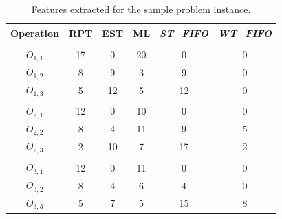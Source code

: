 \documentclass[runningheads]{llncs}
\newcommand{\stfifo}{\textit{ST\_FIFO}\xspace}
\newcommand{\wtfifo}{\textit{WT\_FIFO}\xspace}
\begin{document}
\begin{table}[tb]
  \setlength{\tabcolsep}{10.0pt}
  \centering
    \begin{center}
    \caption{Features extracted for the sample problem instance.}
    \label{tab3}
      \begin{tabular}{c  c  c  c  c  c}
        \textbf{Operation} & \textbf{RPT} & \textbf{EST} & \textbf{ML} & \textbf{\stfifo} & \textbf{\wtfifo}\\
        \hline
                      \\
        $O_{1,1}$  & 17 & 0   & 20	&  0  & 0\\
        $O_{1,2}$  & 8  & 9   & 3		&  9  & 0\\
        $O_{1,3}$  & 5  & 12  & 5	  &  12 & 0\\
                      \\
        $O_{2,1}$  & 12 & 0   & 10	&  0  & 0\\
        $O_{2,2}$  & 8  & 4   & 11	&  9  & 5\\
        $O_{2,3}$  & 2  & 10  & 7	  &  17 & 2\\
                          \\
        $O_{3,1}$  & 12 & 0  & 11	  &  0  & 0\\
        $O_{3,2}$  & 8  & 4  & 6		&  4  & 0\\
        $O_{3,3}$  & 5  & 7  & 5		&  15 & 8\\
      \end{tabular}
    \end{center} 
  \end{table}
\end{document}
